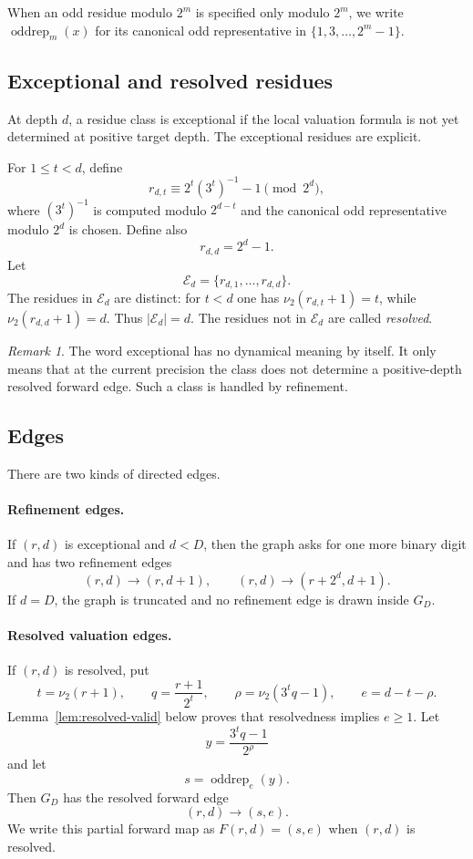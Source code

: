 \documentclass[11pt]{article}
\theoremstyle{definition}
\theoremstyle{remark}
\newtheorem{remark}[theorem]{Remark}
\newcommand{\nuu}{\nu_2}
\newcommand{\Ecal}{\mathcal E}
\newcommand{\oddrep}{\operatorname{oddrep}}
\begin{document}
When an odd residue modulo $2^m$ is specified only modulo $2^m$, we write $\oddrep_m(x)$ for its canonical odd representative in $\{1,3,\ldots,2^m-1\}$.

\subsection{Exceptional and resolved residues}

At depth $d$, a residue class is exceptional if the local valuation formula is not yet determined at positive target depth.  The exceptional residues are explicit.

For $1\le t<d$, define
\[
r_{d,t}\equiv 2^t(3^t)^{-1}-1\pmod {2^d},
\]
where $(3^t)^{-1}$ is computed modulo $2^{d-t}$ and the canonical odd representative modulo $2^d$ is chosen.  Define also
\[
r_{d,d}=2^d-1.
\]
Let
\[
\Ecal_d=\{r_{d,1},\ldots,r_{d,d}\}.
\]
The residues in $\Ecal_d$ are distinct: for $t<d$ one has $\nuu(r_{d,t}+1)=t$, while $\nuu(r_{d,d}+1)=d$.  Thus $|\Ecal_d|=d$.  The residues not in $\Ecal_d$ are called \emph{resolved}.

\begin{remark}
The word exceptional has no dynamical meaning by itself.  It only means that at the current precision the class does not determine a positive-depth resolved forward edge.  Such a class is handled by refinement.
\end{remark}

\subsection{Edges}

There are two kinds of directed edges.

\paragraph{Refinement edges.}
If $(r,d)$ is exceptional and $d<D$, then the graph asks for one more binary digit and has two refinement edges
\[
(r,d)\longrightarrow (r,d+1),
\qquad
(r,d)\longrightarrow (r+2^d,d+1).
\]
If $d=D$, the graph is truncated and no refinement edge is drawn inside $G_D$.

\paragraph{Resolved valuation edges.}
If $(r,d)$ is resolved, put
\[
t=\nuu(r+1),
\qquad
q=\frac{r+1}{2^t},
\qquad
\rho=\nuu(3^tq-1),
\qquad
e=d-t-\rho.
\]
Lemma~\ref{lem:resolved-valid} below proves that resolvedness implies $e\ge1$.  Let
\[
y=\frac{3^tq-1}{2^\rho}
\]
and let
\[
s=\oddrep_e(y).
\]
Then $G_D$ has the resolved forward edge
\[
(r,d)\longrightarrow(s,e).
\]
We write this partial forward map as $F(r,d)=(s,e)$ when $(r,d)$ is resolved.
\end{document}
